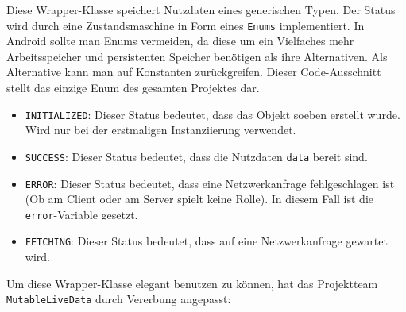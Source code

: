 Diese Wrapper-Klasse speichert Nutzdaten eines generischen Typen. Der
Status wird durch eine Zustandsmaschine in Form eines \texttt{Enums}
implementiert. In Android sollte man Enums vermeiden, da diese um ein
Vielfaches mehr Arbeitsspeicher und persistenten Speicher benötigen als
ihre Alternativen. Als Alternative kann man auf Konstanten
zurückgreifen. Dieser Code-Ausschnitt stellt das einzige Enum des
gesamten Projektes dar. \cite{avoid-enums}

\begin{itemize}
\tightlist
\item
  \texttt{INITIALIZED}: Dieser Status bedeutet, dass das Objekt soeben
  erstellt wurde. Wird nur bei der erstmaligen Instanziierung verwendet.
\item
  \texttt{SUCCESS}: Dieser Status bedeutet, dass die Nutzdaten
  \texttt{data} bereit sind.
\item
  \texttt{ERROR}: Dieser Status bedeutet, dass eine Netzwerkanfrage
  fehlgeschlagen ist (Ob am Client oder am Server spielt keine Rolle).
  In diesem Fall ist die \texttt{error}-Variable gesetzt.
\item
  \texttt{FETCHING}: Dieser Status bedeutet, dass auf eine
  Netzwerkanfrage gewartet wird.
\end{itemize}

Um diese Wrapper-Klasse elegant benutzen zu können, hat das Projektteam
\texttt{MutableLiveData} durch Vererbung angepasst:

